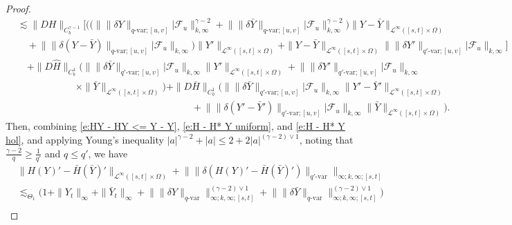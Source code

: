 \documentclass[11pt,reqno]{amsart}
\numberwithin{equation}{section}
\begin{document}
\begin{proof}
\begin{align}
&\lesssim \|DH\|_{C^{\gamma - 1}_b} \bigg[ \Big( \big(\big\| \|\delta Y\|_{q\text{-}\mathrm{var};[u,v]} \big| \mathcal F_{u} \big\|^{\gamma - 2}_{k,\infty} + \big\| \|\delta \bar Y\|_{q\text{-}\mathrm{var};[u,v]} \big| \mathcal F_u \big\|^{\gamma - 2}_{k,\infty}\big) \|Y - \bar Y\|_{\mathcal L^{\infty}([s,t] \times \Omega)} \\ \nonumber 
&\quad + \big\| \|\delta (Y - \bar Y)\|_{q\text{-}\mathrm{var};[u,v]} \big| \mathcal F_u \big\|_{k,\infty} \Big)\|Y'\|_{\mathcal L^{\infty}([s,t] \times \Omega)} + \|Y - \bar Y\|_{\mathcal L^{\infty}([s,t] \times \Omega)} \big\| \|\delta Y'\|_{q'\text{-}\mathrm{var};[u,v]} \big| \mathcal F_u \big\|_{k,\infty} \bigg] \\ \nonumber
&\quad + \|D \hat H\|_{C^1_b} \Big(\big\| \|\delta \bar Y\|_{q'\text{-}\mathrm{var};[u,v]} \big| \mathcal F_u \big\|_{k,\infty} \|Y'\|_{\mathcal L^{\infty}([s,t] \times \Omega)} + \big\| \|\delta Y'\|_{q'\text{-}\mathrm{var};[u,v]} \big| \mathcal F_u \big\|_{k,\infty} \\ \nonumber
&\qquad \qquad \qquad \times \|\bar Y\|_{\mathcal L^{\infty}([s,t] \times \Omega)} \Big) + \|D \bar H\|_{C^1_b} \Big(\big\| \|\delta \bar Y\|_{q'\text{-}\mathrm{var};[u,v]} \big| \mathcal F_u \big\|_{k,\infty} \|Y' - \bar Y'\|_{\mathcal L^{\infty}([s,t] \times \Omega)} \\ \nonumber
&\qquad \qquad \qquad \qquad \qquad \qquad \qquad \qquad \qquad  + \big\| \|\delta (Y' - \bar Y')\|_{q'\text{-}\mathrm{var};[u,v]} \big| \mathcal F_u \big\|_{k,\infty} \|\bar Y\|_{\mathcal L^{\infty}([s,t] \times \Omega)} \Big). 
\end{align}
Then, combining \eqref{e:HY - HY <= Y - Y}, \eqref{e:H - H* Y uniform}, and \eqref{e:H - H* Y hol}, and applying Young's inequality $|a|^{\gamma-2} + |a| \le 2 + 2 |a|^{(\gamma - 2) \vee 1}$, noting that $\frac{\gamma - 2}{q} \ge \frac{1}{q'}$ and $q \le q'$, we have 
\begin{equation}\label{e:H - H* Y hol'}
\begin{aligned}
&\|H(Y)' - \bar H(\bar Y)'\|_{\mathcal L^{\infty}([s,t] \times \Omega)} + \big\| \|\delta (H(Y)' - \bar H(\bar Y)' )\|_{q'\text{-}\mathrm{var}} \big\|_{\infty;k,\infty;[s,t]} \\
&\lesssim_{\Theta_{1}} \Big(1 + \|Y_{t}\|_{\infty} + \|\bar Y_{t}\|_{\infty} + \big\| \|\delta Y\|_{q\text{-}\mathrm{var}} \big\|^{(\gamma - 2)\vee 1}_{\infty;k,\infty;[s,t]} + \big\| \|\delta \bar Y\|_{q\text{-}\mathrm{var}} \big\|^{(\gamma - 2)\vee 1}_{\infty;k,\infty;[s,t]}\Big) \\

\end{aligned}
\end{equation}
\end{proof}
\end{document}
